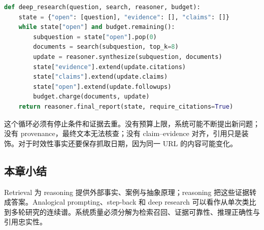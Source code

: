 \begin{lstlisting}[language=Python,caption={带 provenance 与停止条件的 retrieval-reasoning 循环}]
def deep_research(question, search, reasoner, budget):
    state = {"open": [question], "evidence": [], "claims": []}
    while state["open"] and budget.remaining():
        subquestion = state["open"].pop(0)
        documents = search(subquestion, top_k=8)
        update = reasoner.synthesize(subquestion, documents)
        state["evidence"].extend(update.citations)
        state["claims"].extend(update.claims)
        state["open"].extend(update.followups)
        budget.charge(documents, update)
    return reasoner.final_report(state, require_citations=True)
\end{lstlisting}

这个循环必须有停止条件和证据去重。没有预算上限，系统可能不断提出新问题；没有 provenance，最终文本无法核查；没有 claim--evidence 对齐，引用只是装饰。对于时效性事实还要保存抓取日期，因为同一 URL 的内容可能变化。


\subsection{本章小结}

Retrieval 为 reasoning 提供外部事实、案例与抽象原理；reasoning 把这些证据转成答案。Analogical prompting、step-back 和 deep research 可以看作从单次类比到多轮研究的连续谱。系统质量必须分解为检索召回、证据可靠性、推理正确性与引用忠实性。

